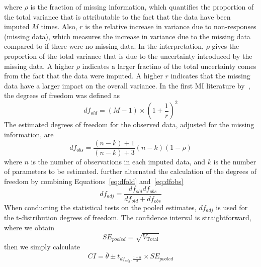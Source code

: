 where $\rho$ is the fraction of missing information, which quantifies the proportion of the total variance that is attributable to the fact that the data have been imputed $M$ times. 
Also, $r$ is the relative increase in variance due to non-responses (missing data), which measures the increase in variance due to the missing data compared to if there were no missing data. 
In the interpretation, $\rho$ gives the proportion of the total variance that is due to the uncertainty introduced by the missing data. 
A higher $\rho$ indicates a larger fractino of the total uncertainty comes from the fact that the data were imputed.
A higher $r$ indicates that the missing data have a larger impact on the overall variance. 
In the first MI literature by~\citet{rubin1987multiple}, the degrees of freedom was defined as
\begin{equation}\label{eq:dfold}
    df_{old}=(M-1)\times (1+\frac{1}{r})^2
\end{equation}
The estimated degrees of freedom for the observed data, adjusted for the missing information, are
\begin{equation}\label{eq:dfobs}
    df_{obs}=\frac{(n-k)+1}{(n-k)+3}(n-k)(1-\rho)
\end{equation}
where $n$ is the number of observations in each imputed data, and $k$ is the number of parameters to be estimated.
\citet{barnard1999miscellanea} further alternated the calculation of the degrees of freedom by combining Equations~\ref{eq:dfold} and~\ref{eq:dfobs}
\begin{equation}
    df_{adj}=\frac{df_{old}df_{obs}}{df_{old}+df_{obs}}
\end{equation}
When conducting the statistical tests on the pooled estimates, $df_{adj}$ is used for the t-distribution degrees of freedom. 
The confidence interval is straightforward, where we obtain 
\begin{equation}
    SE_{pooled}=\sqrt{V_{\text{Total}}}
\end{equation}
then we simply calculate 
\begin{equation}
    CI=\bar{\theta}\pm t_{df_{adj},\frac{1-\alpha}{2}}\times SE_{pooled}
\end{equation}
